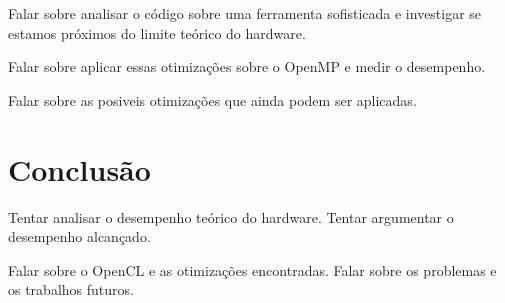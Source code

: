\documentclass[paper=a4, fontsize=12pt]{scrartcl} %
\numberwithin{equation}{section} %
\numberwithin{figure}{section} %
\numberwithin{table}{section} %
\begin{document}
Falar sobre analisar o código sobre uma ferramenta sofisticada e investigar se estamos próximos do limite teórico do hardware.

Falar sobre aplicar essas otimizações sobre o OpenMP e medir o desempenho.

Falar sobre as posiveis otimizações que ainda podem ser aplicadas.

\section{Conclusão}

Tentar analisar o desempenho teórico do hardware. Tentar argumentar o desempenho alcançado.

Falar sobre o OpenCL e as otimizações encontradas. Falar sobre os problemas e os trabalhos futuros.



\end{document}
